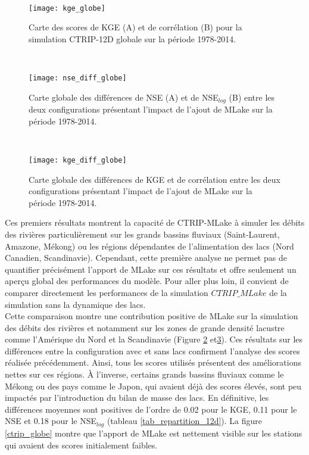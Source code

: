 ~\\

\begin{figure}
\centering
\texttt{[image: kge\_globe]}
\caption{Carte des scores de KGE (A) et de corrélation (B) pour la simulation CTRIP-12D globale sur la période 1978-2014.}
\label{kge_globe}
\end{figure}

~\\

\begin{figure}
\centering
\texttt{[image: nse\_diff\_globe]}
\caption{Carte globale des différences de NSE (A) et de NSE$_{log}$ (B) entre les deux configurations présentant l'impact de l'ajout de MLake sur la période 1978-2014.}
\label{diff_nse_globe}
\end{figure}

~\\

\begin{figure}
\centering
\texttt{[image: kge\_diff\_globe]}
\caption{Carte globale des différences de KGE et de corrélation entre les deux configurations présentant l'impact de l'ajout de MLake sur la période 1978-2014.}
\label{diff_kge_globe}
\end{figure}

\clearpage

Ces premiers résultats montrent la capacité de CTRIP-MLake à simuler les débits des rivières particulièrement sur les grands bassins fluviaux (Saint-Laurent, Amazone, Mékong) ou les régions dépendantes de l'alimentation des lacs (Nord Canadien, Scandinavie). Cependant, cette première analyse ne permet pas de quantifier précisément l'apport de MLake sur ces résultats et offre seulement un aperçu global des performances du modèle. Pour aller plus loin, il convient de comparer directement les performances de la simulation $CTRIP\_MLake$ de la simulation sans la dynamique des lacs.\\
Cette comparaison montre une contribution positive de MLake sur la simulation des débits des rivières et notamment sur les zones de grande densité lacustre comme l'Amérique du Nord et la Scandinavie (Figure \ref{diff_nse_globe} et\ref{diff_kge_globe}). Ces résultats sur les différences entre la configuration avec et sans lacs confirment l'analyse des scores réalisée précédemment. Ainsi, tous les scores utilisés présentent des améliorations nettes sur ces régions. À l'inverse, certains grands bassins fluviaux comme le Mékong ou des pays comme le Japon, qui avaient déjà des scores élevés, sont peu impactés par l'introduction du bilan de masse des lacs. En définitive, les différences moyennes sont positives de l'ordre de 0.02 pour le KGE, 0.11 pour le NSE et 0.18 pour le NSE$_{log}$ (tableau \ref{tab_repartition_12d}). La figure \ref{ctrip_globe} montre que l'apport de MLake est nettement visible sur les stations qui avaient des scores initialement faibles.\\

